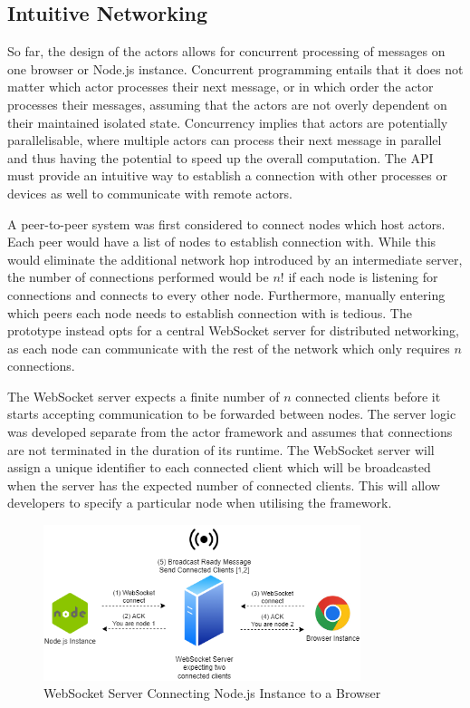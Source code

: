 \documentclass[12pt, a4paper]{report}
\theoremstyle{definition}
\theoremstyle{definition}%
\theoremstyle{definition}%
\theoremstyle{definition}%
\theoremstyle{definition}%
\theoremstyle{definition}%
\begin{document}
\subsection{Intuitive Networking}
So far, the design of the actors allows for concurrent processing of messages on one browser or Node.js instance. Concurrent programming entails that it does not matter which actor processes their next message, or in which order the actor processes their messages, assuming that the actors are not overly dependent on their maintained isolated state. Concurrency implies that actors are potentially parallelisable, where multiple actors can process their next message in parallel and thus having the potential to speed up the overall computation. The API must provide an intuitive way to establish a connection with other processes or devices as well to communicate with remote actors.

A peer-to-peer system was first considered to connect nodes which host actors. Each peer would have a list of nodes to establish connection with. While this would eliminate the additional network hop introduced by an intermediate server, the number of connections performed would be $n!$ if each node is listening for connections and connects to every other node. Furthermore, manually entering which peers each node needs to establish connection with is tedious. The prototype instead opts for a central WebSocket server for distributed networking, as each node can communicate with the rest of the network which only requires $n$ connections.

The WebSocket server expects a finite number of $n$ connected clients before it starts accepting communication to be forwarded between nodes. The server logic was developed separate from the actor framework and assumes that connections are not terminated in the duration of its runtime. The WebSocket server will assign a unique identifier to each connected client which will be broadcasted when the server has the expected number of connected clients. This will allow developers to specify a particular node when utilising the framework.

\begin{figure}[H]
    \begin{centering}
        \includegraphics[width=350px]{resources/websocketconnection.png}
        \caption{WebSocket Server Connecting Node.js Instance to a Browser}
    \end{centering}
\end{figure}
 
\end{document}
